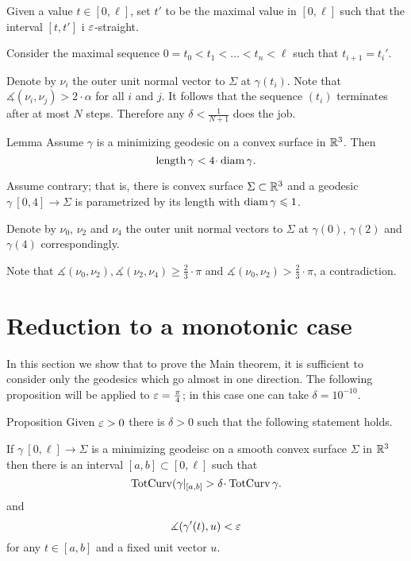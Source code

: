 \documentclass[a4paper,10pt]{amsart}
\begin{document}
Given a value $t\in [0,\ell]$,
set $t'$ to be the maximal value in $[0,\ell]$ such that the interval $[t,t']$ i $\varepsilon$-straight.

Consider the maximal sequence $0=t_0<t_1<\dots<t_n<\ell$
such that $t_{i+1}=t_i'$.

Denote by $\nu_i$ the outer unit normal vector to $\Sigma$ at $\gamma(t_i)$. 
Note that $\measuredangle(\nu_i,\nu_j)>2\cdot\alpha$ for all $i$ and $j$.
It follows that the sequence $(t_i)$ terminates after at most $N$ steps.
Therefore any $\delta<\tfrac1{N+1}$ does the job.
\qeds


\begin{thm}{Lemma}\label{lem:diam-length}
Assume $\gamma$ is a minimizing geodesic on a convex surface in $\mathbb{R}^3$.
Then 
\[\length\gamma< 4\cdot\diam \gamma.\]
\end{thm}

Assume contrary;
that is, 
there is convex surface $\Sigma\subset\mathbb{R}^3$
and a geodesic $\gamma\:[0,4]\to \Sigma$ 
is parametrized by its length with $\operatorname{diam} \gamma\leqslant 1$.

Denote by $\nu_0$, $\nu_2$ and $\nu_4$ the outer unit normal vectors
to $\Sigma$ at $\gamma(0)$, $\gamma(2)$ and $\gamma(4)$ correspondingly.

Note that $\measuredangle(\nu_0,\nu_2), \measuredangle(\nu_2,\nu_4)\ge\tfrac23\cdot\pi$ and $\measuredangle(\nu_0,\nu_2)>\tfrac23\cdot\pi$,
a contradiction.
\qeds



\section{Reduction to a monotonic case}

In this section we show that to prove the Main theorem,
it is sufficient to consider only the geodesics which go almost in one direction.
The following proposition will be applied to $\varepsilon=\tfrac\pi4$;
in this case one can take $\delta=10^{-10}$.

\begin{thm}{Proposition}\label{prop:almost-const}
Given $\varepsilon>0$ there is $\delta>0$
such that the following statement holds.

If $\gamma\:[0,\ell]\to\Sigma$ is a minimizing geodeisc 
on a smooth convex surface $\Sigma$ in $\mathbb{R}^3$
then there is an interval $[a,b]\subset[0,\ell]$
such that \[\tc(\gamma|_{[a,b]}>\delta\cdot\tc\gamma.\]
and 
\[\measuredangle(\gamma'(t),u)<\varepsilon\] 
for any $t\in[a,b]$
and a fixed unit vector $u$.
\end{thm}
\end{document}
